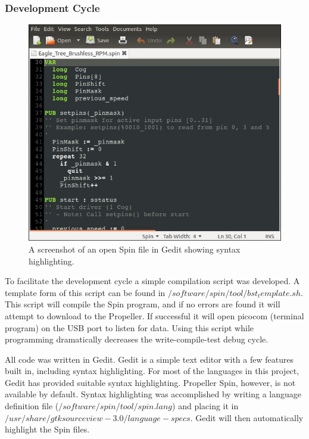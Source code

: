\documentclass{article}
\numberwithin{equation}{section} %
\begin{document}
\subsubsection{Development Cycle}

\begin{figure}[h!]
  \centering
	\includegraphics[scale=.4]{gedit_spin_screenshot.jpg}
  \caption{A screenshot of an open Spin file in Gedit showing syntax highlighting.}
\end{figure}  
 
To facilitate the development cycle a simple compilation script was developed. A template form of this script can be found in $/software/spin/tool/bst_template.sh$. This script will compile the Spin program, and if no errors are found it will attempt to download to the Propeller. If successful it will open picocom (terminal program) on the USB port to listen for data. Using this script while programming dramatically decreases the write-compile-test debug cycle.



All code was written in Gedit. Gedit is a simple text editor with a few features built in, including syntax highlighting. For most of the languages in this project, Gedit has provided suitable syntax highlighting. Propeller Spin, however, is not available by default. Syntax highlighting was accomplished by writing a language definition file ($/software/spin/tool/spin.lang$) and placing it in $/usr/share/gtksourceview-3.0/language-specs$. Gedit will then automatically highlight the Spin files.
\end{document}
